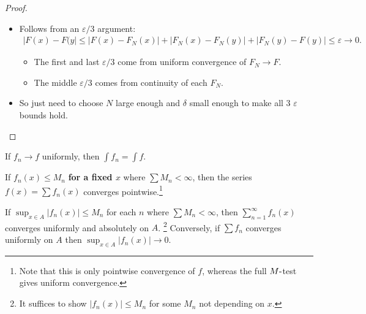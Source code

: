 \begin{proof}

\envlist

\begin{itemize}
\item
  Follows from an \(\varepsilon/3\) argument:
  \begin{align*}  
  {\left\lvert {F(x) - F(y} \right\rvert} \leq 
  {\left\lvert {F(x) - F_N(x)} \right\rvert} + {\left\lvert {F_N(x) - F_N(y)} \right\rvert} + {\left\lvert {F_N(y) - F(y)} \right\rvert} 
  \leq {\varepsilon}\to 0
  .\end{align*}

  \begin{itemize}
  \tightlist
  \item
    The first and last \({\varepsilon}/3\) come from uniform convergence
    of \(F_N\to F\).
  \item
    The middle \({\varepsilon}/3\) comes from continuity of each
    \(F_N\).
  \end{itemize}
\item
  So just need to choose \(N\) large enough and \(\delta\) small enough
  to make all 3 \(\varepsilon\) bounds hold.
\end{itemize}

\end{proof}

\begin{proposition}

If \(f_n \to f\) uniformly, then \(\int f_n = \int f\).

\end{proposition}

\begin{proposition}

If \(f_n(x) \leq M_n\) \textbf{for a fixed \(x\)} where
\(\sum M_n < \infty\), then the series \(f(x) = \sum f_n(x)\) converges
pointwise.\footnote{Note that this is only pointwise convergence of
  \(f\), whereas the full \(M{\hbox{-}}\)test gives uniform convergence.}

\end{proposition}

\begin{proposition}

If \(\sup_{x\in A} {\left\lvert {f_n(x)} \right\rvert} \leq M_n\) for
each \(n\) where \(\sum M_n < \infty\), then
\(\sum_{n=1}^\infty f_n(x)\) converges uniformly and absolutely on
\(A\). \footnote{It suffices to show
  \({\left\lvert {f_n(x)} \right\rvert} \leq M_n\) for some \(M_n\) not
  depending on \(x\).} Conversely, if \(\sum f_n\) converges uniformly
on \(A\) then
\(\sup_{x\in A} {\left\lvert {f_n(x)} \right\rvert} \to 0\).

\end{proposition}


